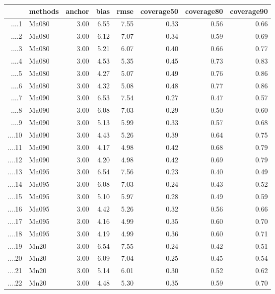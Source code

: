 \begin{table}[ht]
\centering
\begin{tabular}{rlrrrrrr}
  \hline
 & methods & anchor & bias & rmse & coverage50 & coverage80 & coverage90 \\ 
  \hline
....1 & Ma080 & 3.00 & 6.55 & 7.55 & 0.33 & 0.56 & 0.66 \\ 
  ....2 & Ma080 & 3.00 & 6.12 & 7.07 & 0.34 & 0.59 & 0.69 \\ 
  ....3 & Ma080 & 3.00 & 5.21 & 6.07 & 0.40 & 0.66 & 0.77 \\ 
  ....4 & Ma080 & 3.00 & 4.53 & 5.35 & 0.45 & 0.73 & 0.83 \\ 
  ....5 & Ma080 & 3.00 & 4.27 & 5.07 & 0.49 & 0.76 & 0.86 \\ 
  ....6 & Ma080 & 3.00 & 4.32 & 5.08 & 0.48 & 0.77 & 0.86 \\ 
  ....7 & Ma090 & 3.00 & 6.53 & 7.54 & 0.27 & 0.47 & 0.57 \\ 
  ....8 & Ma090 & 3.00 & 6.08 & 7.03 & 0.29 & 0.50 & 0.60 \\ 
  ....9 & Ma090 & 3.00 & 5.13 & 5.99 & 0.33 & 0.57 & 0.68 \\ 
  ....10 & Ma090 & 3.00 & 4.43 & 5.26 & 0.39 & 0.64 & 0.75 \\ 
  ....11 & Ma090 & 3.00 & 4.17 & 4.98 & 0.42 & 0.68 & 0.79 \\ 
  ....12 & Ma090 & 3.00 & 4.20 & 4.98 & 0.42 & 0.69 & 0.79 \\ 
  ....13 & Ma095 & 3.00 & 6.54 & 7.56 & 0.23 & 0.40 & 0.49 \\ 
  ....14 & Ma095 & 3.00 & 6.08 & 7.03 & 0.24 & 0.43 & 0.52 \\ 
  ....15 & Ma095 & 3.00 & 5.10 & 5.97 & 0.28 & 0.49 & 0.59 \\ 
  ....16 & Ma095 & 3.00 & 4.42 & 5.26 & 0.32 & 0.56 & 0.66 \\ 
  ....17 & Ma095 & 3.00 & 4.16 & 4.99 & 0.35 & 0.60 & 0.70 \\ 
  ....18 & Ma095 & 3.00 & 4.19 & 4.99 & 0.36 & 0.60 & 0.71 \\ 
  ....19 & Mn20 & 3.00 & 6.54 & 7.55 & 0.24 & 0.42 & 0.51 \\ 
  ....20 & Mn20 & 3.00 & 6.09 & 7.04 & 0.25 & 0.45 & 0.54 \\ 
  ....21 & Mn20 & 3.00 & 5.14 & 6.01 & 0.30 & 0.52 & 0.62 \\ 
  ....22 & Mn20 & 3.00 & 4.48 & 5.30 & 0.35 & 0.59 & 0.70 \\ 

\end{tabular}
\end{table}

